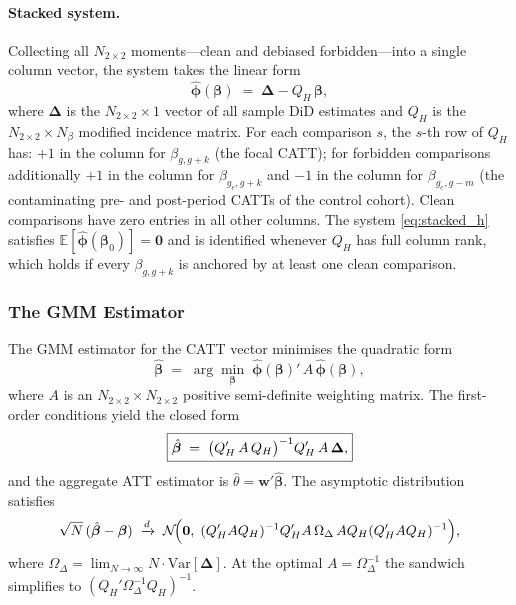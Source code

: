 \documentclass[12pt,letterpaper]{article}
\theoremstyle{remark}
\theoremstyle{definition}
\newcommand{\E}{\mathbb{E}}
\begin{document}
\paragraph{Stacked system.}
Collecting all $N_{2\times2}$ moments---clean and debiased forbidden---into
a single column vector, the system takes the linear form
\begin{equation}
  \hat{\boldsymbol{\phi}}(\boldsymbol{\beta})
  \;=\;
  \boldsymbol{\Delta} - Q_H\,\boldsymbol{\beta},
  \label{eq:stacked_h}
\end{equation}
where $\boldsymbol{\Delta}$ is the $N_{2\times2}\times1$ vector of all
sample DiD estimates and $Q_H$ is the $N_{2\times2}\times N_\beta$ modified
incidence matrix. For each comparison $s$, the $s$-th row of $Q_H$ has:
$+1$ in the column for $\beta_{g,g+k}$ (the focal CATT);
for forbidden comparisons additionally $+1$ in the column for
$\beta_{g_e,g+k}$ and $-1$ in the column for $\beta_{g_e,g-m}$
(the contaminating pre- and post-period CATTs of the control cohort).
Clean comparisons have zero entries in all other columns. The system
\eqref{eq:stacked_h} satisfies $\E[\hat{\boldsymbol{\phi}}(\boldsymbol{\beta}_0)]=\mathbf{0}$
and is identified whenever $Q_H$ has full column rank, which holds if
every $\beta_{g,g+k}$ is anchored by at least one clean comparison.

\subsubsection{The GMM Estimator}
\label{sec:gmm_hetero_estimator}

The GMM estimator for the CATT vector minimises the quadratic form
\begin{equation}
  \hat{\boldsymbol{\beta}}
  \;=\;
  \arg\min_{\boldsymbol{\beta}}\;
  \hat{\boldsymbol{\phi}}(\boldsymbol{\beta})'\,A\,
  \hat{\boldsymbol{\phi}}(\boldsymbol{\beta}),
  \label{eq:gmm_h_obj}
\end{equation}
where $A$ is an $N_{2\times2}\times N_{2\times2}$ positive semi-definite
weighting matrix. The first-order conditions yield the closed form
\begin{equation}
  \boxed{%
    \hat{\boldsymbol{\beta}}
    \;=\;
    \bigl(Q_H'\,A\,Q_H\bigr)^{-1}Q_H'\,A\,\boldsymbol{\Delta},
  }
  \label{eq:gmm_h}
\end{equation}
and the aggregate ATT estimator is $\hat{\theta}=\mathbf{w}'\hat{\boldsymbol{\beta}}$.
The asymptotic distribution satisfies
\begin{equation}
  \sqrt{N}\,(\hat{\boldsymbol{\beta}}-\boldsymbol{\beta})
  \;\xrightarrow{d}\;
  \mathcal{N}\!\Bigl(
    \mathbf{0},\;
    (Q_H'AQ_H)^{-1}Q_H'A\,\Omega_\Delta\,AQ_H(Q_H'AQ_H)^{-1}
  \Bigr),
  \label{eq:asy_h}
\end{equation}
where $\Omega_\Delta=\lim_{N\to\infty}N\cdot\mathrm{Var}[\boldsymbol{\Delta}]$.
At the optimal $A=\Omega_\Delta^{-1}$ the sandwich simplifies to
$(Q_H'\Omega_\Delta^{-1}Q_H)^{-1}$.
\end{document}
